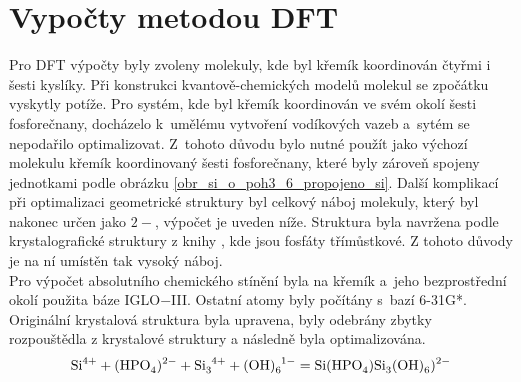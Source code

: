 \documentclass[
  printed, %
  table,   %
  lof,     %
  lot,     %
  oneside,
]{fithesis3}
\begin{document}
\begin{figure}
\begin{center}
\label{obr_sio3p_vysledky_I}\end{center}
\end{figure} 
  
\section{Vypočty metodou DFT} \label{kapitola_DFT}
Pro DFT výpočty byly zvoleny molekuly, kde byl křemík koordinován čtyřmi i šesti kyslíky. Při konstrukci kvantově-chemických modelů molekul se zpočátku vyskytly potíže. Pro systém, kde byl křemík koordinován ve svém okolí šesti fosforečnany, docházelo k~umělému vytvoření vodíkových vazeb a~sytém se nepodařilo optimalizovat. Z~tohoto důvodu bylo nutné použít jako výchozí molekulu křemík koordinovaný šesti fosforečnany, které byly zároveň spojeny jednotkami  podle obrázku \ref{obr_si_o_poh3_6_propojeno_si}. Další komplikací při optimalizaci geometrické struktury byl celkový náboj molekuly, který byl nakonec určen jako $2-$, výpočet je uveden níže. Struktura  byla navržena podle krystalografické struktury z knihy \cite{korotcenkov2013handbook}, kde jsou fosfáty třímůstkové. Z tohoto důvody je na ní umístěn tak vysoký náboj.\\
Pro výpočet absolutního chemického stínění byla na křemík a~jeho bezprostřední okolí použita báze IGLO$-$III. Ostatní atomy byly počítány s~bazí 6-31G*. Originální krystalová struktura byla upravena, byly odebrány zbytky rozpouštědla z krystalové struktury a následně byla optimalizována.
\begin{displaymath}
\ce{Si}^{4+} + \ce{(HPO4)^{2-}} + \ce{Si3^{4+}} + \ce{(OH)6^1-} = \ce{Si(HPO4)Si3(OH)6)^{2-}}
\end{displaymath}
\end{document}
